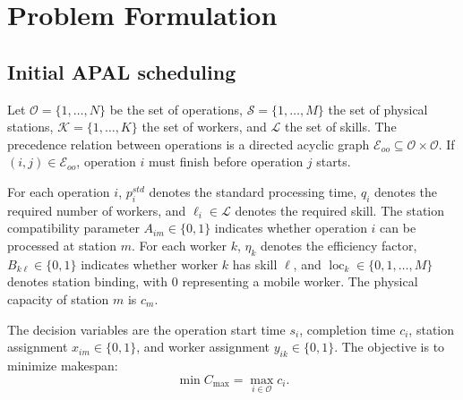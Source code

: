 \section{Problem Formulation}
\label{sec:formulation}

\subsection{Initial APAL scheduling}

Let $\mathcal{O}=\{1,\dots,N\}$ be the set of operations, $\mathcal{S}=\{1,\dots,M\}$ the set of physical stations, $\mathcal{K}=\{1,\dots,K\}$ the set of workers, and $\mathcal{L}$ the set of skills. The precedence relation between operations is a directed acyclic graph $\mathcal{E}_{oo}\subseteq \mathcal{O}\times \mathcal{O}$. If $(i,j)\in \mathcal{E}_{oo}$, operation $i$ must finish before operation $j$ starts.

For each operation $i$, $p_i^{std}$ denotes the standard processing time, $q_i$ denotes the required number of workers, and $\ell_i\in\mathcal{L}$ denotes the required skill. The station compatibility parameter $A_{im}\in\{0,1\}$ indicates whether operation $i$ can be processed at station $m$. For each worker $k$, $\eta_k$ denotes the efficiency factor, $B_{k\ell}\in\{0,1\}$ indicates whether worker $k$ has skill $\ell$, and $\operatorname{loc}_k\in\{0,1,\dots,M\}$ denotes station binding, with 0 representing a mobile worker. The physical capacity of station $m$ is $c_m$.

The decision variables are the operation start time $s_i$, completion time $c_i$, station assignment $x_{im}\in\{0,1\}$, and worker assignment $y_{ik}\in\{0,1\}$. The objective is to minimize makespan:
\begin{equation}
  \min C_{\max} = \max_{i\in\mathcal{O}} c_i .
\end{equation}

